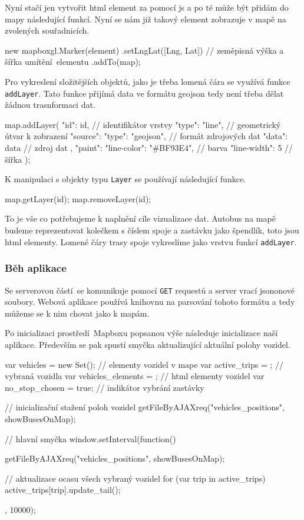 Nyní stačí jen vytvořit \gls{html} element za pomocí \gls{js} a po té může být přidám do mapy následující funkcí. Nyní se nám již takový element zobrazuje v mapě na zvolených souřadnicích.

\begin{code}[frame=none]
new mapboxgl.Marker(element)
  .setLngLat([Lng, Lat]) // zeměpisná výška a šířka
    umítění elementu
  .addTo(map);
\end{code}

Pro vykreslení složitějších objektů, jako je třeba lomená čára se využívá funkce \verb-addLayer-. Tato funkce přijímá data ve formátu \gls{geojson} tedy není třeba dělat žádnou trasnformaci dat.

\begin{code}[frame=none]
map.addLayer({
  "id": id, // identifikátor vrstvy
  "type": "line", // geometrický útvar k zobrazení
  "source": {
    "type": "geojson", // formát zdrojových dat
    "data": data // zdroj dat
  },
  "paint": {
    "line-color": "#BF93E4", // barva
    "line-width": 5 // šířka
  }
});
\end{code}

K manipulaci s objekty typu \verb-Layer- se používají následující funkce.

\begin{code}[frame=none]
map.getLayer(id);
map.removeLayer(id);
\end{code}

To je vše co potřebujeme k naplnění cíle vizualizace dat. Autobus na mapě budeme reprezentovat kolečkem s číslem spoje a zastávku jako špendlík, toto jsou \gls{html} elementy. Lomené čáry trasy spoje vykreslíme jako vrstvu funkcí \verb-addLayer-.

\subsubsection{Běh aplikace}

Se serverovou částí se komunikuje pomocí \verb-GET- requestů a server vrací \gls{json}onové soubory. Webová aplikace používá knihovnu na parsování tohoto formátu a tedy můžeme se k nim chovat jako k mapám.

\bigbreak

Po inicializaci prostředí Mapboxu popsanou výše následuje inicializace naší aplikace. Především se pak spustí smyčka aktualizující aktuální polohy vozidel.

\begin{code}[frame=none]
var vehicles = new Set(); // elementy vozidel v mape
var active_trips = {}; // vybraná vozidla
var vehicles_elements = {}; // html elementy vozidel
var no_stop_chosen = true; // indikátor vybrání zastávky

// inicializační stažení poloh vozidel
getFileByAJAXreq("vehicles_positions", showBusesOnMap);

// hlavní smyčka
window.setInterval(function(){
getFileByAJAXreq("vehicles_positions", showBusesOnMap);

// aktualizace ocasu všech vybraný vozidel
for (var trip in active_trips){
  active_trips[trip].update_tail();
}
}, 10000);
\end{code}

